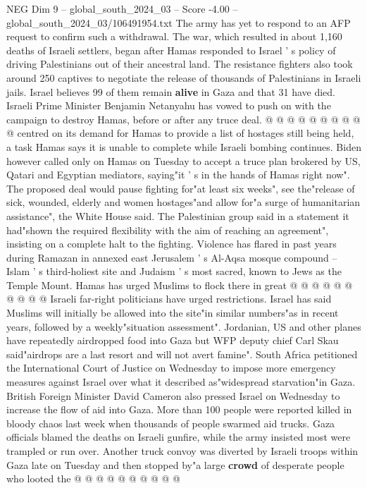\begin{textsample}{NEG Dim 9 – global\_south\_2024\_03 – Score -4.00 – global\_south\_2024\_03/106491954.txt}
The army has yet to respond to an AFP request to confirm such a withdrawal.
The war, which resulted in about 1,160 deaths of Israeli settlers, began after Hamas responded to Israel ' s policy of driving Palestinians out of their ancestral land.
The resistance fighters also took around 250 captives to negotiate the release of thousands of Palestinians in Israeli jails.
Israel believes 99 of them remain \textbf{alive} in Gaza and that 31 have died.
Israeli Prime Minister Benjamin Netanyahu has vowed to push on with the campaign to destroy Hamas, before or after any truce deal. @ @ @ @ @ @ @ @ @ @ centred on its demand for Hamas to provide a list of hostages still being held, a task Hamas says it is unable to complete while Israeli bombing continues.
Biden however called only on Hamas on Tuesday to accept a truce plan brokered by US, Qatari and Egyptian mediators, saying"it ' s in the hands of Hamas right now".
The proposed deal would pause fighting for"at least six weeks", see the"release of sick, wounded, elderly and women hostages"and allow for"a surge of humanitarian assistance", the White House said.
The Palestinian group said in a statement it had"shown the required flexibility with the aim of reaching an agreement", insisting on a complete halt to the fighting.
Violence has flared in past years during Ramazan in annexed east Jerusalem ' s Al-Aqsa mosque compound -- Islam ' s third-holiest site and Judaism ' s most sacred, known to Jews as the Temple Mount.
Hamas has urged Muslims to flock there in great @ @ @ @ @ @ @ @ @ @ Israeli far-right politicians have urged restrictions.
Israel has said Muslims will initially be allowed into the site"in similar numbers"as in recent years, followed by a weekly"situation assessment".
Jordanian, US and other planes have repeatedly airdropped food into Gaza but WFP deputy chief Carl Skau said"airdrops are a last resort and will not avert famine".
South Africa petitioned the International Court of Justice on Wednesday to impose more emergency measures against Israel over what it described as"widespread starvation"in Gaza.
British Foreign Minister David Cameron also pressed Israel on Wednesday to increase the flow of aid into Gaza.
More than 100 people were reported killed in bloody chaos last week when thousands of people swarmed aid trucks.
Gaza officials blamed the deaths on Israeli gunfire, while the army insisted most were trampled or run over.
Another truck convoy was diverted by Israeli troops within Gaza late on Tuesday and then stopped by"a large \textbf{crowd} of desperate people who looted the @ @ @ @ @ @ @ @ @ @

\end{textsample}
